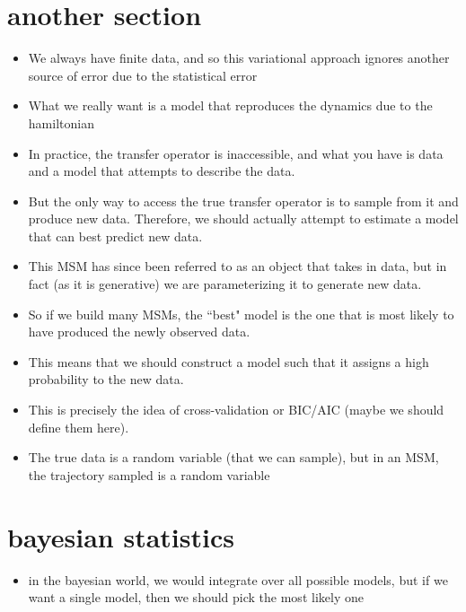 \documentclass[journal=jpcbfk, layout=traditional, manuscript=article]{achemso}
\begin{document}
\section{another section}
\begin{itemize}
\item We always have finite data, and so this variational approach ignores another source of error due to the statistical error
\item What we really want is a model that reproduces the dynamics due to the hamiltonian
\item In practice, the transfer operator is inaccessible, and what you have is data and a model that attempts to describe the data.
\item But the only way to access the true transfer operator is to sample from it and produce new data. Therefore, we should actually attempt to estimate a model that can best predict new data.
\item This MSM has since been referred to as an object that takes in data, but in fact (as it is generative) we are parameterizing it to generate new data. 
\item So if we build many MSMs, the ``best" model is the one that is most likely to have produced the newly observed data. 
\item This means that we should construct a model such that it assigns a high probability to the new data. 
\item This is precisely the idea of cross-validation or BIC/AIC (maybe we should define them here).
\item The true data is a random variable (that we can sample), but in an MSM, the trajectory sampled is a random variable
\end{itemize}

\section{bayesian statistics}
\begin{itemize}
\item in the bayesian world, we would integrate over all possible models, but if we want a single model, then we should pick the most likely one
\end{itemize}
\end{document}
